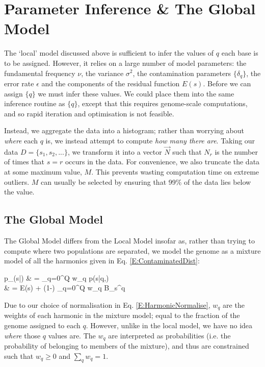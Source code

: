 \documentclass[fleqn,usenatbib]{mnras}
\newcommand{\eref}[1]{Eq. \eqref{#1}}
\begin{document}
{			\section{Parameter Inference \& The Global Model}\label{A:Global}

				The `local' model discussed above is sufficient to infer the values of $q$ each base is to be assigned. However, it relies on a large number of  model parameters: the fundamental frequency $\nu$, the variance $\sigma^2$, the contamination parameters $\{\delta_q\}$, the error rate $\epsilon$ and the components of the residual function $E(s)$. Before we can assign $\{q\}$ we must infer these values. We could place them into the same inference routine as $\{q\}$, except that this requires genome-scale computations, and so rapid iteration and optimisation is not feasible. 

				Instead, we aggregate the data into a histogram; rather than worrying about \textit{where} each $q$ is, we instead attempt to compute \textit{how many there are}. Taking our data $D = \{s_1, s_2, ...\}$, we transform it into a vector $\vec{N}$ such that $N_r$ is the number of times that $s = r$ occurs in the data. For convenience, we also truncate the data at some maximum value, $M$. This prevents wasting computation time on extreme outliers. $M$ can usually be selected by ensuring that 99\% of the data lies below the value.

			\subsection{The Global Model}
				The Global Model differs from the Local Model insofar as, rather than trying to compute where two populations are separated, we model the genome as a mixture model of all the harmonics given in \eref{E:ContaminatedDist}:
				\begin{spalign}
					p_(s|\vec{\theta}) & = \sum_{q=0}^Q w_q p(s|q,\vec{\theta}) 
					\\
					& = \epsilon E(s) + (1-\epsilon) \sum_{q=0}^Q w_q B_s^q \label{E:DefinePGlobal}
				\end{spalign}
				Due to our choice of normalisation in \eref{E:HarmonicNormalise}, $w_q$ are the weights of each harmonic in the mixture model; equal to the fraction of the genome assigned to each $q$. However, unlike in the local model, we have no idea \textit{where} those $q$ values are. The $w_q$ are interpreted as probabilities (i.e. the probability of belonging to members of the mixture), and thus are constrained such that $w_q \geq 0$ and $\sum_q w_q = 1$.

}
\end{document}
